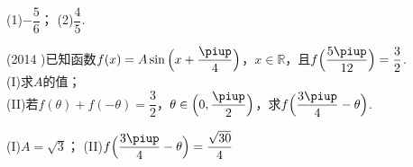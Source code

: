 \begin{exercise}
      \begin{answer}
        (1)$-\dfrac56$；
        (2)$\dfrac45$.
      \end{answer}
    \vspace{3cm}
    \item%
      (2014 )已知函数$f(x)=A\sin{\Bigl(x+\dfrac{\piup}4\Bigr)}$，$x\in\mathbb{R}$，且$f\Bigl(\dfrac{5\piup}{12}\Bigr)=\dfrac{3}2$.\\
      (I)求$A$的值；\\
      (II)若$f(\theta)+f(-\theta)=\dfrac{3}2$，$\theta\in \Bigl(0,\dfrac{\piup}2\Bigr)$，求$f\Bigl(\dfrac{3\piup}4-\theta\Bigr)$.
      \begin{answer}
        (I)$A=\sqrt{3}$；
        (II)$f\Bigl(\dfrac{3\piup}4-\theta\Bigr)=\dfrac{\sqrt{30}}4$
      \end{answer}
    \vspace{4cm}

\end{exercise}
